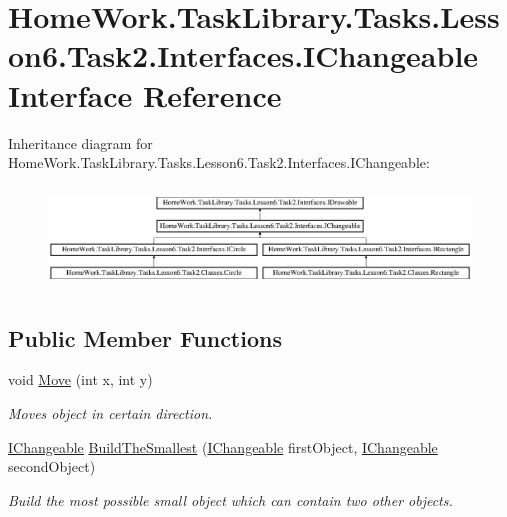 \hypertarget{interface_home_work_1_1_task_library_1_1_tasks_1_1_lesson6_1_1_task2_1_1_interfaces_1_1_i_changeable}{}\section{Home\+Work.\+Task\+Library.\+Tasks.\+Lesson6.\+Task2.\+Interfaces.\+I\+Changeable Interface Reference}
\label{interface_home_work_1_1_task_library_1_1_tasks_1_1_lesson6_1_1_task2_1_1_interfaces_1_1_i_changeable}
Inheritance diagram for Home\+Work.\+Task\+Library.\+Tasks.\+Lesson6.\+Task2.\+Interfaces.\+I\+Changeable\+:\begin{figure}[H]
\begin{center}
\leavevmode
\includegraphics[height=2.725061cm]{interface_home_work_1_1_task_library_1_1_tasks_1_1_lesson6_1_1_task2_1_1_interfaces_1_1_i_changeable}
\end{center}
\end{figure}
\subsection*{Public Member Functions}
\begin{DoxyCompactItemize}
\item 
void \mbox{\hyperlink{interface_home_work_1_1_task_library_1_1_tasks_1_1_lesson6_1_1_task2_1_1_interfaces_1_1_i_changeable_a86e3712a90bdc833d17cff47cdfd7923}{Move}} (int x, int y)
\begin{DoxyCompactList}\small\item\em Moves object in certain direction. \end{DoxyCompactList}\item 
\mbox{\hyperlink{interface_home_work_1_1_task_library_1_1_tasks_1_1_lesson6_1_1_task2_1_1_interfaces_1_1_i_changeable}{I\+Changeable}} \mbox{\hyperlink{interface_home_work_1_1_task_library_1_1_tasks_1_1_lesson6_1_1_task2_1_1_interfaces_1_1_i_changeable_a3ec62d87fd0e526760dcf7f929ac74ae}{Build\+The\+Smallest}} (\mbox{\hyperlink{interface_home_work_1_1_task_library_1_1_tasks_1_1_lesson6_1_1_task2_1_1_interfaces_1_1_i_changeable}{I\+Changeable}} first\+Object, \mbox{\hyperlink{interface_home_work_1_1_task_library_1_1_tasks_1_1_lesson6_1_1_task2_1_1_interfaces_1_1_i_changeable}{I\+Changeable}} second\+Object)
\begin{DoxyCompactList}\small\item\em Build the most possible small object which can contain two other objects. \end{DoxyCompactList}\end{DoxyCompactItemize}


